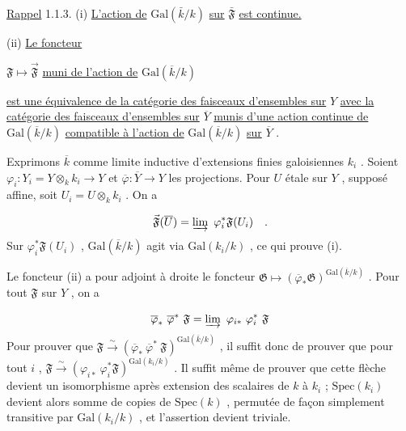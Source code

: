 \underline{Rappel} 1.1.3. (i) \underline{L'action de} $\mathrm{Gal}(\bar{k}/k)$ \underline{sur} $\bar{\mathfrak{F}}$ \underline{est continue.}



(ii) \underline{Le foncteur}

$\mathfrak{F} \longmapsto \vec{\mathfrak{F}}$ \underline{muni de l'action de} $\mathrm{Gal}(\overline{k}/k)$

\underline{est une équivalence de la catégorie des faisceaux d'ensembles sur} $Y$ \underline{avec la catégorie des faisceaux d'ensembles sur} $\overline{Y}$ \underline{munis d'une action continue de} $\mathrm{Gal}(\overline{k}/k)$ \underline{compatible à l'action de} $\mathrm{Gal}(\overline{k}/k)$ \underline{sur} $\overline{Y}$ .

Exprimons $\overline{k}$ comme limite inductive d'extensions finies galoisiennes $k_i$ . Soient $\varphi_i : Y_i = Y \otimes_k k_i \longrightarrow Y$ et $\overline{\varphi} : \overline{Y} \longrightarrow Y$ les projections. Pour $U$ étale sur $Y$ , supposé affine, soit $U_i = U \otimes_k k_i$ . On a

\begin{equation*}
\vec{\mathfrak{F}}(\overline{U}) = \varinjlim \ \varphi_i^* \mathfrak{F}(U_i) \quad .
\end{equation*}
Sur $\varphi_i^* \mathfrak{F}(U_i)$ , $\mathrm{Gal}(\overline{k}/k)$ agit via $\mathrm{Gal}(k_i/k)$ , ce qui prouve (i).

Le foncteur (ii) a pour adjoint à droite le foncteur $\mathfrak{G} \longmapsto (\overline{\varphi}_* \mathfrak{G})^{\mathrm{Gal}(\overline{k}/k)}$ . Pour tout $\mathfrak{F}$ sur $Y$ , on a

\begin{equation*}
\overline{\varphi}_* \ \overline{\varphi}^* \ \mathfrak{F} = \varinjlim \ \varphi_{i*} \ \varphi_i^* \ \mathfrak{F}
\end{equation*}
Pour prouver que $\mathfrak{F} \overset{\sim}{\longrightarrow} (\overline{\varphi}_* \ \overline{\varphi}^* \ \mathfrak{F})^{\mathrm{Gal}(\overline{k}/k)}$ , il suffit donc de prouver que pour tout $i$ , $\mathfrak{F} \overset{\sim}{\longrightarrow} (\varphi_{i*} \ \varphi_i^* \mathfrak{F})^{\mathrm{Gal}(k_i/k)}$ . Il suffit même de prouver que cette flèche devient un isomorphisme après extension des scalaires de $k$ à $k_i$ ; $\mathrm{Spec}(k_i)$ devient alors somme de copies de $\mathrm{Spec}(k)$ , permutée de façon simplement transitive par $\mathrm{Gal}(k_i/k)$ , et l'assertion devient triviale.

